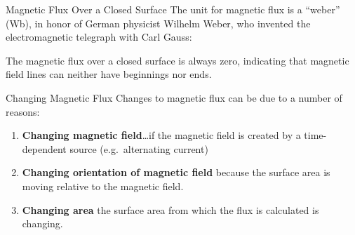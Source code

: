 \documentclass[12pt,aspectratio=169]{beamer}
\newcommand{\mb}[1]{\mathbf{#1}}
\newcommand{\eq}[2]{\vspace{#1}{\Large\begin{displaymath}#2\end{displaymath}}}
\begin{document}
\begin{frame}{Magnetic Flux Over a Closed Surface}
  The unit for magnetic flux is a ``weber'' (\si{\weber}), in honor of German
  physicist Wilhelm Weber, who invented the electromagnetic telegraph with Carl
  Gauss:

  \eq{-.3in}{
    \SI1{\weber}=\SI1{\tesla\metre\squared}
  }
  
  The magnetic flux over a closed surface is always zero,
  indicating that magnetic field lines can neither have beginnings nor ends.

  \eq{-.2in}{
    \oint\mb{B}\cdot d\mb{A}=0
  }
\end{frame}


\begin{frame}{Changing Magnetic Flux}
  Changes to magnetic flux can be due to a number of reasons:
  \begin{enumerate}
  \item\textbf{Changing magnetic field}\ldots if the magnetic field is created
    by a time-dependent source (e.g.\ alternating current)
  \item\textbf{Changing orientation of magnetic field} because the
    surface area is moving relative to the magnetic field.
  \item\textbf{Changing area} the surface area from which the flux is
    calculated is changing.
  \end{enumerate}
\end{frame}
\end{document}
